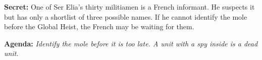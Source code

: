 \clearpage
\begin{secretbox}
\textbf{Secret:} One of Ser Elia's thirty militiamen is a French informant. He
suspects it but has only a shortlist of three possible names. If he cannot identify
the mole before the Global Heist, the French may be waiting for them.

\medskip\noindent\textcolor{SecretRed}{\textbf{Agenda:}} \textit{Identify the mole
before it is too late. A unit with a spy inside is a dead unit.}
\end{secretbox}
